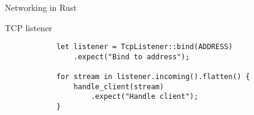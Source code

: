 \begin{frame}[fragile]{Networking in Rust}
    \begin{block}{TCP listener}
        \begin{verbatim}
            let listener = TcpListener::bind(ADDRESS)
                .expect("Bind to address");
            
            for stream in listener.incoming().flatten() {
                handle_client(stream)
                    .expect("Handle client");
            }
        \end{verbatim}
    \end{block}
\end{frame}
